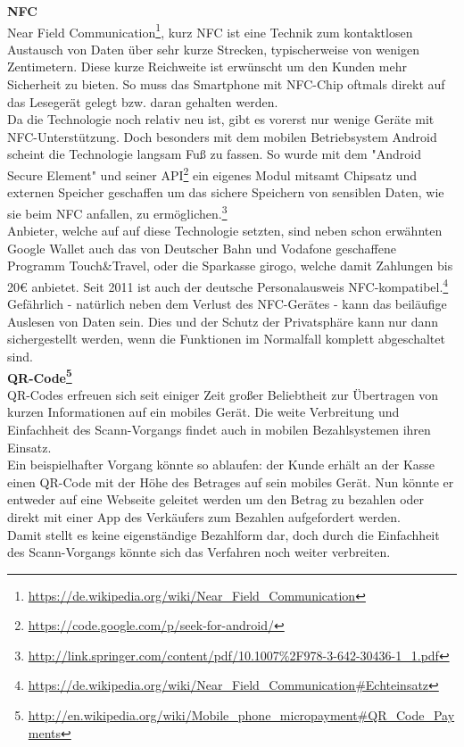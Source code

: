 \textbf{NFC}\\
Near Field Communication\footnote{\url{https://de.wikipedia.org/wiki/Near_Field_Communication}}, kurz NFC ist eine Technik zum kontaktlosen Austausch von Daten über sehr kurze Strecken, typischerweise von wenigen Zentimetern. Diese kurze Reichweite ist erwünscht um den Kunden mehr Sicherheit zu bieten. So muss das Smartphone mit NFC-Chip oftmals direkt auf das Lesegerät gelegt bzw. daran gehalten werden. \\
Da die Technologie noch relativ neu ist, gibt es vorerst nur wenige Geräte mit NFC-Unterstützung. Doch besonders mit dem mobilen Betriebsystem Android scheint die Technologie langsam Fuß zu fassen. So wurde mit dem "Android Secure Element" und seiner API\footnote{\url{https://code.google.com/p/seek-for-android/}} ein eigenes Modul mitsamt Chipsatz und externen Speicher geschaffen um das sichere Speichern von sensiblen Daten, wie sie beim NFC anfallen, zu ermöglichen.\footnote{\url{http://link.springer.com/content/pdf/10.1007\%2F978-3-642-30436-1_1.pdf}}\\
Anbieter, welche auf auf diese Technologie setzten, sind neben schon erwähnten Google Wallet auch das von Deutscher Bahn und Vodafone geschaffene Programm Touch\&Travel, oder die Sparkasse girogo, welche damit Zahlungen bis 20\euro{} anbietet.
Seit 2011 ist auch der deutsche Personalausweis NFC-kompatibel.\footnote{\url{https://de.wikipedia.org/wiki/Near_Field_Communication\#Echteinsatz}}\\
Gefährlich - natürlich neben dem Verlust des NFC-Gerätes - kann das beiläufige Auslesen von Daten sein. Dies und der Schutz der Privatsphäre kann nur dann sichergestellt werden, wenn die Funktionen im Normalfall komplett abgeschaltet sind.\\

\textbf{QR-Code\footnote{\url{http://en.wikipedia.org/wiki/Mobile_phone_micropayment\#QR_Code_Payments}}}\\
QR-Codes erfreuen sich seit einiger Zeit großer Beliebtheit zur Übertragen von kurzen Informationen auf ein mobiles Gerät. Die weite Verbreitung und Einfachheit des Scann-Vorgangs findet auch in mobilen Bezahlsystemen ihren Einsatz. \\
Ein beispielhafter Vorgang könnte so ablaufen: der Kunde erhält an der Kasse einen QR-Code mit der Höhe des Betrages auf sein mobiles Gerät. Nun könnte er entweder auf eine Webseite geleitet werden um den Betrag zu bezahlen oder direkt mit einer App des Verkäufers zum Bezahlen aufgefordert werden.\\
Damit stellt es keine eigenständige Bezahlform dar, doch durch die Einfachheit des Scann-Vorgangs könnte sich das Verfahren noch weiter verbreiten. 